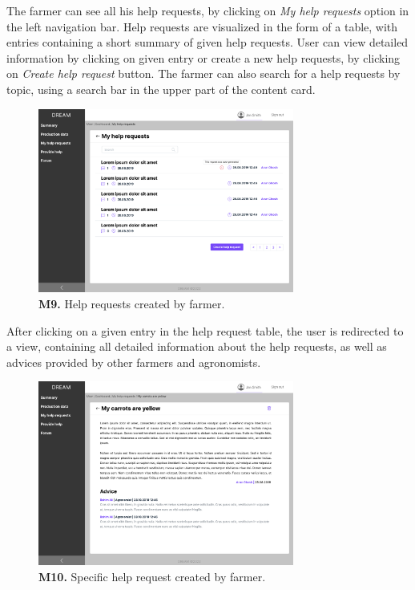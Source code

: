     The farmer can see all his help requests, by clicking on \textit{My help requests} option in the left navigation bar. Help requests are visualized in the form of a table, with entries containing a short summary of given help requests. User can view detailed information by clicking on given entry or create a new help requests, by clicking on \textit{Create help request} button. The farmer can also search for a help requests by topic, using a search bar in the upper part of the content card.
    \begin{figure}[H]
        \centering
        \includegraphics[width=0.75\textwidth]{mockups/Farmer_Dashboard_My help requests.png}
        \caption{\textbf{M9.} Help requests created by farmer.}
    \end{figure}
    
    After clicking on a given entry in the help request table, the user is redirected to a view, containing all detailed information about the help requests, as well as advices provided by other farmers and agronomists.
    \begin{figure}[H]
        \centering
        \includegraphics[width=0.75\textwidth]{mockups/Farmer_Dashboard_My help requests_VIew request.png}
        \caption{\textbf{M10.} Specific help request created by farmer.}
    \end{figure}
    
